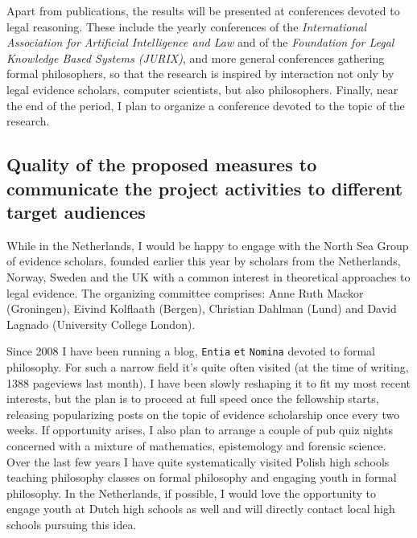 \documentclass[11pt, a4paper]{article}
\begin{document}
\vspace{-4mm}


\noindent Apart from publications, the results will be presented at conferences devoted to legal reasoning. These include the yearly conferences of the \emph{International Association for Artificial Intelligence and Law
} and of the \emph{Foundation for Legal Knowledge Based Systems (JURIX)}, and more general conferences gathering formal philosophers, so that the research is inspired by interaction not only by legal evidence scholars, computer scientists, but also philosophers. 
Finally, near the end of the period, I plan to organize a conference devoted to the topic of the research.


\vspace{-5mm}



\subsection{Quality of the proposed measures to communicate the project activities to different target audiences}

\vspace{-3mm}

While in the Netherlands, I would be happy to engage with the North Sea Group of evidence scholars, founded earlier this year by scholars from the Netherlands, Norway, Sweden and the UK with a common interest in theoretical approaches to legal evidence. The organizing committee comprises: Anne Ruth Mackor (Groningen), Eivind Kolflaath (Bergen), Christian Dahlman (Lund) and David Lagnado (University College London). 

Since 2008 I have been running a blog, \verb|Entia| \verb|et| \verb|Nomina| devoted to formal philosophy. For such a narrow field it's quite often visited (at the time of  writing, 1388 pageviews last month). I have been slowly reshaping it to fit my most recent interests, but the plan is to proceed at full speed once the fellowship starts, releasing popularizing posts on the topic of evidence scholarship once every two weeks. If opportunity arises, I also plan to arrange a couple of pub quiz nights concerned with a mixture of mathematics, epistemology and forensic science. Over the last few years I have quite systematically visited Polish high schools  teaching philosophy classes on formal philosophy and engaging youth in formal philosophy. In the Netherlands, if possible, I would love the opportunity to engage youth at Dutch high schools as well and will directly contact local high schools pursuing this idea.  
\end{document}
